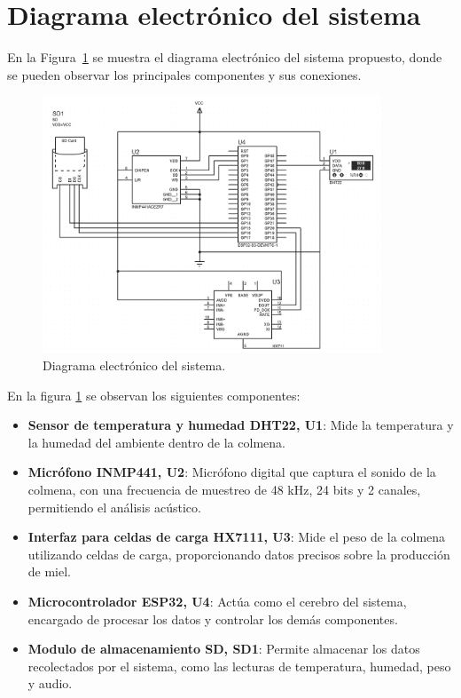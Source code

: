 \section{Diagrama electrónico del sistema}

En la Figura~\ref{fig:diagrama_electronico} se muestra el diagrama electrónico del sistema propuesto, donde se pueden observar los principales componentes y sus conexiones.

\begin{figure}[H]
    \centering
    \includegraphics[width=0.9\textwidth]{assets/cap_3/diagrama_electronico.png}
    \caption{Diagrama electrónico del sistema.}
    \label{fig:diagrama_electronico}
\end{figure}

En la figura \ref{fig:diagrama_electronico} se observan los siguientes componentes:
\begin{itemize}
    \item \textbf{Sensor de temperatura y humedad DHT22, U1}: Mide la temperatura y la humedad del ambiente dentro de la colmena.
    \item \textbf{Micrófono INMP441, U2}: Micrófono digital que captura el sonido de la colmena, con una frecuencia de muestreo de 48 kHz, 24 bits y 2 canales, permitiendo el análisis acústico.
    \item \textbf{Interfaz para celdas de carga HX7111, U3}: Mide el peso de la colmena utilizando celdas de carga, proporcionando datos precisos sobre la producción de miel.
    \item \textbf{Microcontrolador ESP32, U4}: Actúa como el cerebro del sistema, encargado de procesar los datos y controlar los demás componentes.
    \item \textbf{Modulo de almacenamiento SD, SD1}: Permite almacenar los datos recolectados por el sistema, como las lecturas de temperatura, humedad, peso y audio.
\end{itemize}